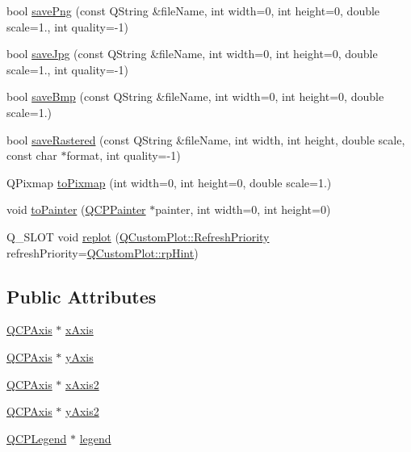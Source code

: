 \begin{DoxyCompactItemize}
bool \hyperlink{classQCustomPlot_a7636261aff1f6d25c9da749ece3fc8b8}{save\+Png} (const Q\+String \&file\+Name, int width=0, int height=0, double scale=1., int quality=-\/1)
\item 
bool \hyperlink{classQCustomPlot_a490c722092d1771e8ce4a7a73dfd84ab}{save\+Jpg} (const Q\+String \&file\+Name, int width=0, int height=0, double scale=1., int quality=-\/1)
\item 
bool \hyperlink{classQCustomPlot_a6629d9e8e6da4bf18055ee0257fdce9a}{save\+Bmp} (const Q\+String \&file\+Name, int width=0, int height=0, double scale=1.)
\item 
bool \hyperlink{classQCustomPlot_ab528b84cf92baabe29b1d0ef2f77c93e}{save\+Rastered} (const Q\+String \&file\+Name, int width, int height, double scale, const char $\ast$format, int quality=-\/1)
\item 
Q\+Pixmap \hyperlink{classQCustomPlot_aabb974d71ce96c137dc04eb6eab844fe}{to\+Pixmap} (int width=0, int height=0, double scale=1.)
\item 
void \hyperlink{classQCustomPlot_a1be68d5c0f1e086d6374d1340a193fb9}{to\+Painter} (\hyperlink{classQCPPainter}{Q\+C\+P\+Painter} $\ast$painter, int width=0, int height=0)
\item 
Q\+\_\+\+S\+L\+OT void \hyperlink{classQCustomPlot_a606fd384b2a637ce2c24899bcbde77d6}{replot} (\hyperlink{classQCustomPlot_a45d61392d13042e712a956d27762aa39}{Q\+Custom\+Plot\+::\+Refresh\+Priority} refresh\+Priority=\hyperlink{classQCustomPlot_a45d61392d13042e712a956d27762aa39adfa1f2387617168d9299f4c8ad15b332}{Q\+Custom\+Plot\+::rp\+Hint})
\end{DoxyCompactItemize}
\subsection*{Public Attributes}
\begin{DoxyCompactItemize}
\item 
\hyperlink{classQCPAxis}{Q\+C\+P\+Axis} $\ast$ \hyperlink{classQCustomPlot_a9a79cd0158a4c7f30cbc702f0fd800e4}{x\+Axis}
\item 
\hyperlink{classQCPAxis}{Q\+C\+P\+Axis} $\ast$ \hyperlink{classQCustomPlot_af6fea5679725b152c14facd920b19367}{y\+Axis}
\item 
\hyperlink{classQCPAxis}{Q\+C\+P\+Axis} $\ast$ \hyperlink{classQCustomPlot_ada41599f22cad901c030f3dcbdd82fd9}{x\+Axis2}
\item 
\hyperlink{classQCPAxis}{Q\+C\+P\+Axis} $\ast$ \hyperlink{classQCustomPlot_af13fdc5bce7d0fabd640f13ba805c0b7}{y\+Axis2}
\item 
\hyperlink{classQCPLegend}{Q\+C\+P\+Legend} $\ast$ \hyperlink{classQCustomPlot_a4eadcd237dc6a09938b68b16877fa6af}{legend}
\end{DoxyCompactItemize}
